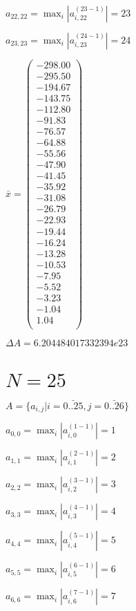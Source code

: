 \documentclass[a4paper,12pt]{article}
\begin{document}
$a _{ 22, 22 } =  \max _i |a _{ i, 22 } ^{ (23 - 1) } | = 23$

$a _{ 23, 23 } =  \max _i |a _{ i, 23 } ^{ (24 - 1) } | = 24$

$\bar { x } = \begin{pmatrix}
-298.00 \\
-295.50 \\
-194.67 \\
-143.75 \\
-112.80 \\
-91.83 \\
-76.57 \\
-64.88 \\
-55.56 \\
-47.90 \\
-41.45 \\
-35.92 \\
-31.08 \\
-26.79 \\
-22.93 \\
-19.44 \\
-16.24 \\
-13.28 \\
-10.53 \\
-7.95 \\
-5.52 \\
-3.23 \\
-1.04 \\
1.04 \\
\end{pmatrix}
$

$\Delta A = 6.204484017332394e23$



\section{ $N = 25$ }
$A = \{ a _{ i, j } | i = \bar { 0..25 }, j = \bar { 0..26 } \}$

$a _{ 0, 0 } =  \max _i |a _{ i, 0 } ^{ (1 - 1) } | = 1$

$a _{ 1, 1 } =  \max _i |a _{ i, 1 } ^{ (2 - 1) } | = 2$

$a _{ 2, 2 } =  \max _i |a _{ i, 2 } ^{ (3 - 1) } | = 3$

$a _{ 3, 3 } =  \max _i |a _{ i, 3 } ^{ (4 - 1) } | = 4$

$a _{ 4, 4 } =  \max _i |a _{ i, 4 } ^{ (5 - 1) } | = 5$

$a _{ 5, 5 } =  \max _i |a _{ i, 5 } ^{ (6 - 1) } | = 6$

$a _{ 6, 6 } =  \max _i |a _{ i, 6 } ^{ (7 - 1) } | = 7$
\end{document}
